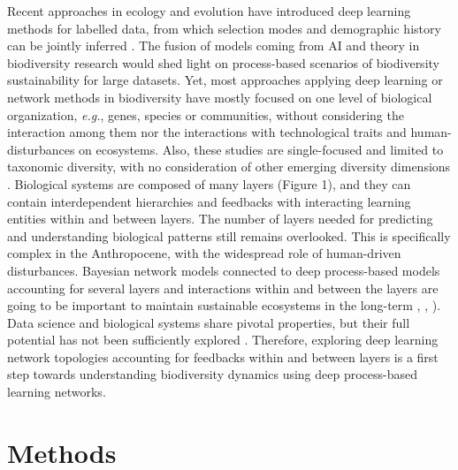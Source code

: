 \documentclass[12pt,a4paper]{article}
\begin{document}
Recent approaches in ecology and evolution have introduced deep learning methods for labelled data, from which selection modes and demographic history can be jointly inferred \citep{sheehan2016deep}. The fusion of models coming from AI and theory in biodiversity research would shed light on process-based scenarios of biodiversity sustainability for large datasets. Yet, most approaches applying deep learning or network methods in biodiversity have mostly focused on one level of biological organization, {\it e.g.}, genes, species or communities, without considering the interaction among them nor the interactions with technological traits and human-disturbances on ecosystems. Also, these studies are single-focused and limited to taxonomic diversity, with no consideration of other emerging diversity dimensions \citep{weiss2019unifying}. Biological systems are composed of many layers (Figure 1), and they can contain interdependent hierarchies and feedbacks with interacting learning entities within and between layers. The number of layers needed for predicting and understanding biological patterns still remains overlooked. This is specifically complex in the Anthropocene, with the widespread role of human-driven disturbances. Bayesian network models connected to deep process-based models accounting for several layers and interactions within and between the layers are going to be important to maintain sustainable ecosystems in the long-term \citep{fontaine2011ecological}, \citep{melian2018deciphering}, \citep{reichstein2019deep}). Data science and biological systems share pivotal properties, but their full potential has not been sufficiently explored \citep{schmidhuber2015deep}. Therefore, exploring deep learning network topologies accounting for feedbacks within and between layers is a first step towards understanding biodiversity dynamics using deep process-based learning networks.

\section{Methods}
\end{document}
